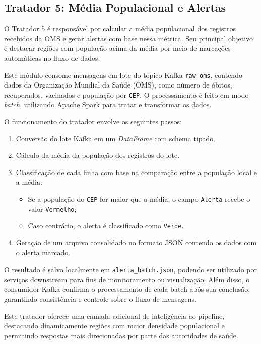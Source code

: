\documentclass[a4paper,12pt]{article}
\begin{document}
\subsection{Tratador 5: Média Populacional e Alertas}

O Tratador 5 é responsável por calcular a média populacional dos registros recebidos da OMS e gerar alertas com base nessa métrica. Seu principal objetivo é destacar regiões com população acima da média por meio de marcações automáticas no fluxo de dados.

Este módulo consome mensagens em lote do tópico Kafka \texttt{raw\_oms}, contendo dados da Organização Mundial da Saúde (OMS), como número de óbitos, recuperados, vacinados e população por \texttt{CEP}. O processamento é feito em modo \textit{batch}, utilizando Apache Spark para tratar e transformar os dados.

O funcionamento do tratador envolve os seguintes passos:
\begin{enumerate}
    \item Conversão do lote Kafka em um \textit{DataFrame} com schema tipado.
    \item Cálculo da média da população dos registros do lote.
    \item Classificação de cada linha com base na comparação entre a população local e a média:
        \begin{itemize}
            \item Se a população do \texttt{CEP} for maior que a média, o campo \texttt{Alerta} recebe o valor \texttt{Vermelho};
            \item Caso contrário, o alerta é classificado como \texttt{Verde}.
        \end{itemize}
    \item Geração de um arquivo consolidado no formato JSON contendo os dados com o alerta marcado.
\end{enumerate}

O resultado é salvo localmente em \texttt{alerta\_batch.json}, podendo ser utilizado por serviços downstream para fins de monitoramento ou visualização. Além disso, o consumidor Kafka confirma o processamento de cada batch após sua conclusão, garantindo consistência e controle sobre o fluxo de mensagens.

Este tratador oferece uma camada adicional de inteligência ao pipeline, destacando dinamicamente regiões com maior densidade populacional e permitindo respostas mais direcionadas por parte das autoridades de saúde.
\end{document}
